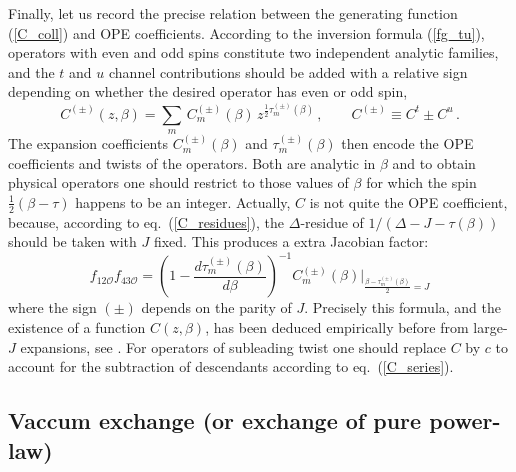 \documentclass[11pt, reqno,preprint]{article}
\def\be{\begin{equation}}
\def\ee{\end{equation}}
\def\OO{\mathcal{O}}
\def\j{J}
\begin{document}
Finally, let us record the precise relation between the generating function (\ref{C_coll}) and OPE coefficients.
According to the inversion formula (\ref{fg_tu}),
operators with even and odd spins constitute two independent analytic families,
and the $t$ and $u$ channel contributions should be added with a relative sign depending on whether
the desired operator has even or odd spin,
\be
 C^{(\pm)}(z,\beta) = \sum_m \,C^{(\pm)}_m(\beta) \,z^{\frac12\tau^{(\pm)}_m(\beta)}\,,
 \qquad C^{(\pm)} \equiv C^t\pm C^u\,.  \label{generating_fct}
\ee
The expansion coefficients $C^{(\pm)}_m(\beta)$ and $\tau^{(\pm)}_m(\beta)$ then encode
the OPE coefficients and twists of the operators.
Both are analytic in $\beta$ and to obtain physical operators one should restrict to those values of $\beta$
for which the spin $\frac12(\beta-\tau)$ happens to be an integer. 
Actually, $C$ is not quite the OPE coefficient, because, according to eq.~(\ref{C_residues}), the $\Delta$-residue of $1/(\Delta-\j-\tau(\beta))$ should be taken with $\j$ fixed. This produces a extra Jacobian factor:
\be
 f_{12\OO}f_{43\OO} =
 \left(1-\frac{d\tau^{(\pm)}_m(\beta)}{d\beta}\right)^{-1} C^{(\pm)}_m(\beta) \Bigg|_{\frac{\beta-\tau^{(\pm)}_m(\beta)}{2}=\j}
\ee
where the sign $(\pm)$ depends on the parity of $\j$.  Precisely this formula, and the existence of a function $C(z,\beta)$,
has been deduced empirically before from large-$\j$ expansions, see \cite{Alday:2015eya,Simmons-Duffin:2016wlq}.
For operators of subleading twist one should replace $C$ by $c$ to account for the subtraction of descendants according to eq.~(\ref{C_series}).

\subsection{Vaccum exchange (or exchange of pure power-law)}
\end{document}
